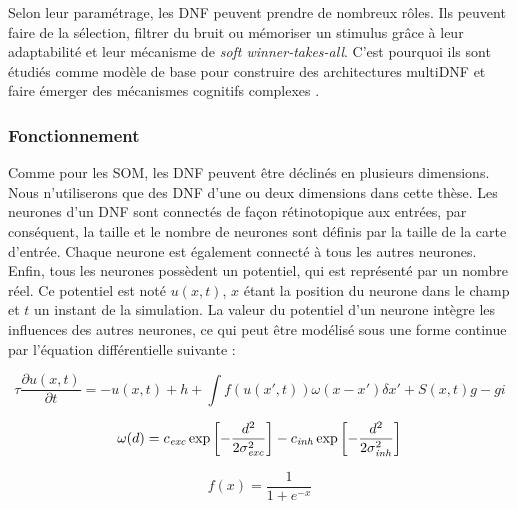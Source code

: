 	Selon leur paramétrage, les DNF peuvent prendre de nombreux rôles. Ils peuvent faire de la sélection, filtrer du bruit ou mémoriser un stimulus grâce à leur adaptabilité et leur mécanisme de \textit{soft winner-takes-all}. C'est pourquoi ils sont étudiés comme modèle de base pour construire des architectures multiDNF et faire émerger des mécanismes cognitifs complexes \cite{sandamirskaya2014dynamic}.

	\subsubsection{Fonctionnement}

	Comme pour les SOM, les DNF peuvent être déclinés en plusieurs dimensions. Nous n'utiliserons que des DNF d'une ou deux dimensions dans cette thèse. Les neurones d'un DNF sont connectés de façon rétinotopique aux entrées, par conséquent, la taille et le nombre de neurones sont définis par la taille de la carte d'entrée. Chaque neurone est également connecté à tous les autres neurones. Enfin, tous les neurones possèdent un potentiel, qui est représenté par un nombre réel. Ce potentiel est noté $u(x,t)$, $x$ étant la position du neurone dans le champ et $t$ un instant de la simulation. La valeur du potentiel d'un neurone intègre les influences des autres neurones, ce qui peut être modélisé sous une forme continue par l'équation différentielle suivante :

	\begin{equation}\label{eq:dnf}
		\tau \frac{\partial u(x, t)}{\partial t} = -u(x,t) + h + \int f(u(x',t))\omega(x-x')\delta x' + S(x,t)g - gi
	\end{equation}

	\begin{equation}\label{eq:diff_gauss}
		\omega(d) = c_{\it exc} \exp \left[ - \frac{d^2}{2 \sigma_{\it exc}^2}\right] - c_{\it inh} \exp \left[ - \frac{d^2}{2 \sigma_{\it inh}^2}\right] 
	\end{equation}

	\begin{equation}
		f(x) = \frac{1}{1+e^{-x}}
	\end{equation}

